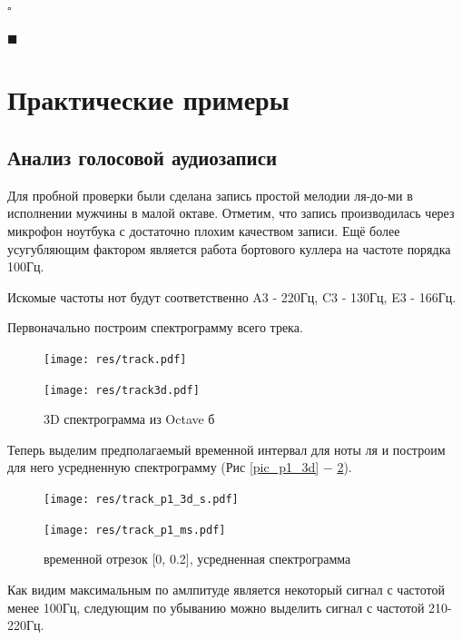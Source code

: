 \documentclass[oneside, final, 12pt]{extarticle}
\begin{document}
$\square$

$\blacksquare$

\cleardoublepage

\section{Практические примеры}

\subsection{Анализ голосовой аудиозаписи}

  Для пробной проверки были сделана запись простой мелодии ля-до-ми
  в исполнении мужчины в малой октаве. Отметим, что запись производилась через
  микрофон ноутбука с достаточно плохим качеством записи. Ещё более
  усугубляющим фактором является работа бортового куллера на частоте порядка
  100Гц.

  Искомые частоты нот будут соответственно A3 - 220Гц, C3 - 130Гц, E3 - 166Гц.

  Первоначально построим спектрограмму всего трека.
  \begin{figure}[h]
    \begin{multicols}{2}
      \hfill
      \texttt{[image: res/track.pdf]}
      \hfill
      \caption{3D спектрограмма из Octave а}
      \label{pic_3da}
      \hfill
      \texttt{[image: res/track3d.pdf]}
      \hfill
      \caption{3D спектрограмма из Octave б}
      \label{pic_3db}
    \end{multicols}
  \end{figure}

  Теперь выделим предполагаемый временной интервал для ноты ля и построим для
  него усредненную спектрограмму (Рис \ref{pic_p1_3d} $-$ \ref{pic_p1_ms}).

  \begin{figure}[t]
    \begin{multicols}{2}
      \hfill
      \texttt{[image: res/track\_p1\_3d\_s.pdf]}
      \hfill
      \caption{временной отрезок [0, 0.2], 3D спектрограмма }
      \label{pic_p1_3d}
      \hfill
      \texttt{[image: res/track\_p1\_ms.pdf]}
      \hfill
      \caption{временной отрезок [0, 0.2], усредненная спектрограмма }
      \label{pic_p1_ms}
    \end{multicols}
  \end{figure}

  Как видим максимальным по амлпитуде является некоторый сигнал с частотой
  менее 100Гц, следующим по убыванию можно выделить сигнал с частотой
  210-220Гц.
\end{document}
